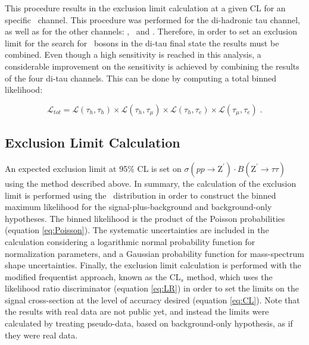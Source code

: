 \noindent This procedure results in the exclusion limit calculation at a given CL for
an specific \Zprimetotautau~channel. This procedure was performed 
for the di-hadronic tau channel, as well as for the other 
channels: \tauh\taumu, \tauh\taue~and \taumu\taue. Therefore, in order 
to set an exclusion limit for the search for \Zprime~bosons in 
the di-tau final state the results must be combined. Even though 
a high sensitivity is reached in this analysis, a considerable
improvement on the sensitivity is achieved by combining 
the results of the four di-tau channels. This can be done by computing
a total binned likelihood:

\begin{equation}
 \mathcal{L}_{tot} = \mathcal{L}(\tau_{h},\tau_{h}) \times \mathcal{L}(\tau_{h},\tau_{\mu}) \times \mathcal{L}(\tau_{h},\tau_{e}) \times \mathcal{L}(\tau_{\mu},\tau_{e}) \; .
\end{equation}



% 

\subsection{Exclusion Limit Calculation}
\label{subsec:ExclusionLimits}

\noindent An expected exclusion limit at 95$\%$ CL is set 
on $\sigma (pp\rightarrow\textrm{Z}^{\prime}) \cdot B(\textrm{Z}^{\prime}\rightarrow\tau\tau)$ using the 
method described above. In summary, the calculation of the exclusion limit
is performed using the \mass~distribution in order to construct the 
binned maximum likelihood for the signal-plus-background and background-only 
hypotheses. The binned likelihood is the product of the Poisson probabilities (equation \ref{eq:Poisson}). The systematic 
uncertainties are included in the calculation considering a logarithmic normal 
probability function for normalization parameters, and a Gaussian probability 
function for mass-spectrum shape uncertainties. Finally, the exclusion limit calculation
is performed with the modified frequentist approach, known as the CL$_{s}$ method, which uses 
the likelihood ratio discriminator (equation \ref{eq:LR}) in order to set the limits 
on the signal cross-section at the level of accuracy desired (equation \ref{eq:CL}). Note 
that the results with real data are not public yet, and instead the limits were calculated by
treating pseudo-data, based on background-only hypothesis, as if they were real data. \\

